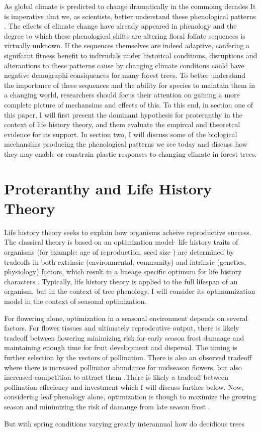 \documentclass{article}\usepackage[]{graphicx}\usepackage[]{color}
\begin{document}
\par As global climate is predicted to change dramatically in the commoing decades It is imperative that we, as scientists, better understand these phenological patterns . The effects of climate change have already appeared in phenology \citep{menzel, wolkovich} and the degree to which these phenological shifts are altering floral foliate sequences is virtually unknown. If the sequences themselves are indeed adaptive, confering a signifcant fitness benefit to indivudals under historical conditions, disruptions and alterantions to these patterns cause by changing climate conditons could have negative demographi consiquences for many forest trees. To better understand the importance of these sequences and the ability for species to maintain them in a changing world, researchers should focus their attention on gaining a more complete picture of mechansims and effects of this. To this end, in section one of this paper, I will first present the dominant hypothesis for proteranthy in the context of life history theory, and them evaluate the empircal and theoretcal evidence for its support. In section two, I will discuss some of the biological mechansims producing the phenological patterns we see today and discuss how they may enable or constrain plastic responses to changing climate in forest trees.
\section{Proteranthy and Life History Theory}
\par Life history theory seeks to explain how organisms acheive reproductive success. The classical theory is based on an optimization model- life history traits of organisms (for example: age of reproduction, seed size ) are determined by tradeoffs in both extrinsic (environmental, community) and intrinsic (genetics, physiology) factors, which result in a lineage specific optimum for life history characters \citep{Stearns2000}. Typically, life history theory is applied to the full lifespan of an organism, but in the context of tree phenology, I will consider its optimumization model in the context of seasonal optimization. 

\par For flowering alone, optimization in a seasonal environment depends on several factors. For flower tissues and ultimately reprodcutive output, there is likely tradeoff between flowering minimizing risk for early season frost damaage and maintaining enough time for fruit development and dispersal. The timing is further selection by the vectors of pollination.  There is also an observed tradeoff where there is increased pollinator abundance for midseason flowers, but also increased competition to attract them \citep{}.There is likely a tradeoff between pollination effeciency and investment which I will discuss further below. Now, considering leaf phenology alone, optimization is though to maximize the growing season and minimizing the risk of damange from late season frost \citep{}. 
\par But with spring conditions varying greatly interannual how do decidious trees 
\end{document}
